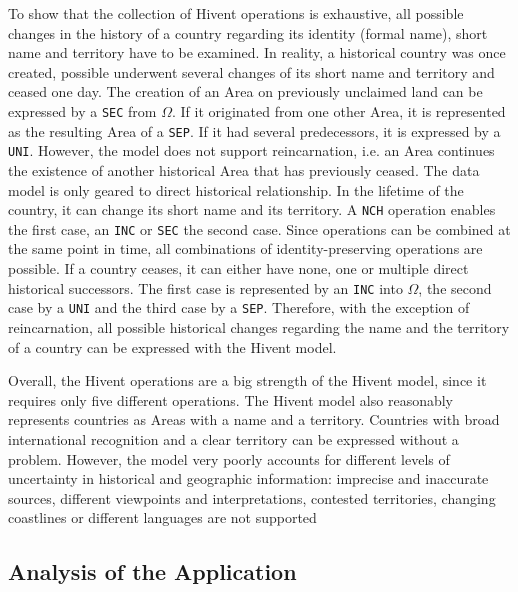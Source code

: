 To show that the collection of Hivent operations is exhaustive, all possible changes in the history of a country regarding its identity (formal name), short name and territory have to be examined. In reality, a historical country was once created, possible underwent several changes of its short name and territory and ceased one day. The creation of an Area on previously unclaimed land can be expressed by a \texttt{SEC} from $\Omega$. If it originated from one other Area, it is represented as the resulting Area of a \texttt{SEP}. If it had several predecessors, it is expressed by a \texttt{UNI}. However, the model does not support reincarnation, i.e. an Area continues the existence of another historical Area that has previously ceased. The data model is only geared to direct historical relationship. In the lifetime of the country, it can change its short name and its territory. A \texttt{NCH} operation enables the first case, an \texttt{INC} or \texttt{SEC} the second case. Since operations can be combined at the same point in time, all combinations of identity-preserving operations are possible. If a country ceases, it can either have none, one or multiple direct historical successors. The first case is represented by an \texttt{INC} into $\Omega$, the second case by a \texttt{UNI} and the third case by a \texttt{SEP}. Therefore, with the exception of reincarnation, all possible historical changes regarding the name and the territory of a country can be expressed with the Hivent model.


Overall, the Hivent operations are a big strength of the Hivent model, since it requires only five different operations.
The Hivent model also reasonably represents countries as Areas with a name and a territory. Countries with broad international recognition and a clear territory can be expressed without a problem. However, the model very poorly accounts for different levels of uncertainty in historical and geographic information: imprecise and inaccurate sources, different viewpoints and interpretations, contested territories, changing coastlines or different languages are not supported



\subsection{Analysis of the Application} %
\label{sub:application}

